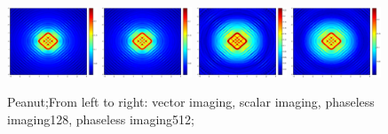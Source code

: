 \documentclass[12pt]{iopart}
\begin{document}
\begin{figure}
	\centering
	\includegraphics[width=0.24\textwidth]{./graphic_phase/rectangle_r_10_k_4_vector.eps}
	\includegraphics[width=0.24\textwidth]{./graphic_phase/rectangle_r_10_k_4_scalar.eps}
	\includegraphics[width=0.24\textwidth]{./graphic_phase/rectangle_r_10_k_4_phaseless_n_128_bias_100.eps}
	\includegraphics[width=0.24\textwidth]{./graphic_phase/rectangle_r_10_k_4_phaseless_n_512_bias_100.eps}
	\caption{Peanut;From left to right: vector imaging, scalar imaging, phaseless imaging128, phaseless imaging512;  }\label{figure_rectangle_phaless}
\end{figure}
\end{document}
